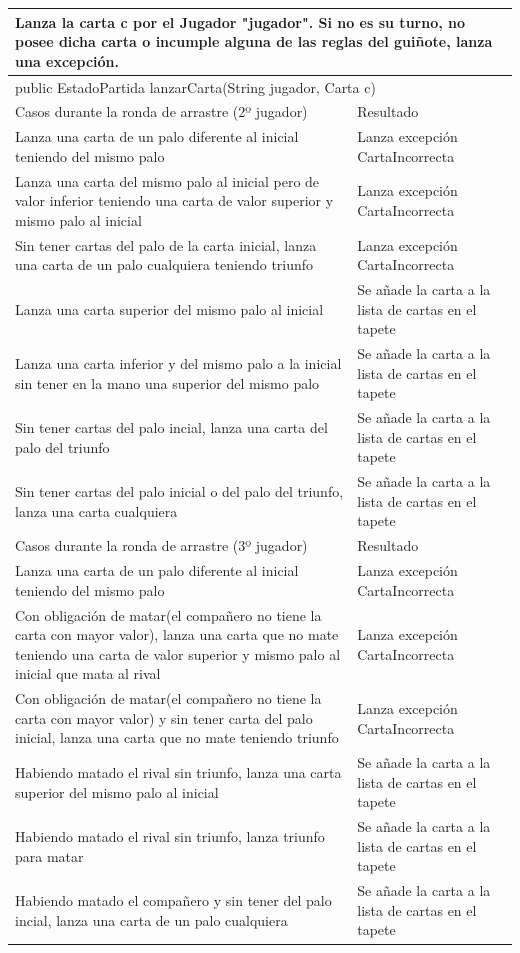 \begin{center}
    \begin{tabular}{ | p{10cm} | p{5cm} |}
    \hline
\multicolumn{2}{|p{14cm}|}{Lanza la carta c por el Jugador "jugador". Si no es su turno, no posee dicha carta o incumple alguna de las reglas del guiñote, lanza una excepción.} \\ \hline
\multicolumn{2}{|l|}{public EstadoPartida lanzarCarta(String jugador, Carta c)} \\ \hline
{Casos durante la ronda de arrastre (2º jugador)} & Resultado \\ \hline
Lanza una carta de un palo diferente al inicial teniendo del mismo palo & Lanza excepción CartaIncorrecta \\ \hline
Lanza una carta del mismo palo al inicial pero de valor inferior teniendo una carta de valor superior y mismo palo al inicial & Lanza excepción CartaIncorrecta \\ \hline
Sin tener cartas del palo de la carta inicial, lanza una carta de un palo cualquiera teniendo triunfo & Lanza excepción CartaIncorrecta \\ \hline
Lanza una carta superior del mismo palo al inicial & Se añade la carta a la lista de cartas en el tapete \\ \hline
Lanza una carta inferior y del mismo palo a la inicial sin tener en la mano una superior del mismo palo & Se añade la carta a la lista de cartas en el tapete \\ \hline
Sin tener cartas del palo incial, lanza una carta del palo del triunfo & Se añade la carta a la lista de cartas en el tapete \\ \hline
Sin tener cartas del palo inicial o del palo del triunfo, lanza una carta cualquiera & Se añade la carta a la lista de cartas en el tapete \\ \hline
Casos durante la ronda de arrastre (3º jugador) & Resultado \\ \hline
Lanza una carta de un palo diferente al inicial teniendo del mismo palo & Lanza excepción CartaIncorrecta \\ \hline
Con obligación de matar(el compañero no tiene la carta con mayor valor), lanza una carta que no mate teniendo una carta de valor superior y mismo palo al inicial que mata al rival & Lanza excepción CartaIncorrecta \\ \hline
Con obligación de matar(el compañero no tiene la carta con mayor valor) y sin tener carta del palo inicial, lanza una carta que no mate teniendo triunfo & Lanza excepción CartaIncorrecta \\ \hline
Habiendo matado el rival sin triunfo, lanza una carta superior del mismo palo al inicial & Se añade la carta a la lista de cartas en el tapete \\ \hline
Habiendo matado el rival sin triunfo, lanza triunfo para matar & Se añade la carta a la lista de cartas en el tapete \\ \hline
Habiendo matado el compañero y sin tener del palo incial, lanza una carta de un palo cualquiera & Se añade la carta a la lista de cartas en el tapete \\ \hline


\end{tabular}
\end{center}
